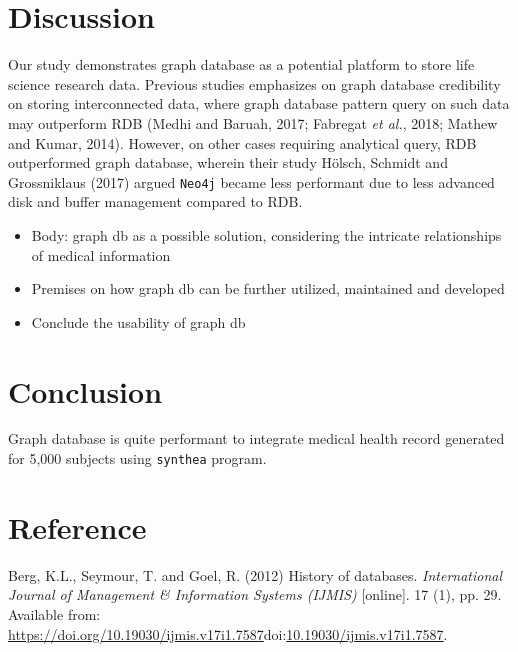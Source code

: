 \documentclass[]{article}
\providecommand{\tightlist}{%
  \setlength{\itemsep}{0pt}\setlength{\parskip}{0pt}}
\begin{document}
\hypertarget{discussion}{%
\section{Discussion}\label{discussion}}

Our study demonstrates graph database as a potential platform to store
life science research data. Previous studies emphasizes on graph
database credibility on storing interconnected data, where graph
database pattern query on such data may outperform RDB (Medhi and
Baruah, 2017; Fabregat \emph{et al.}, 2018; Mathew and Kumar, 2014).
However, on other cases requiring analytical query, RDB outperformed
graph database, wherein their study Hölsch, Schmidt and Grossniklaus
(2017) argued \texttt{Neo4j} became less performant due to less advanced
disk and buffer management compared to RDB.

\begin{itemize}
\tightlist
\item
  Body: graph db as a possible solution, considering the intricate
  relationships of medical information
\item
  Premises on how graph db can be further utilized, maintained and
  developed
\item
  Conclude the usability of graph db
\end{itemize}

\hypertarget{conclusion}{%
\section{Conclusion}\label{conclusion}}

Graph database is quite performant to integrate medical health record
generated for 5,000 subjects using \texttt{synthea} program.

\hypertarget{reference}{%
\section*{Reference}\label{reference}}

\clearpage

\hypertarget{refs}{}
\leavevmode\hypertarget{ref-Berg2012}{}%
Berg, K.L., Seymour, T. and Goel, R. (2012) History of databases.
\emph{International Journal of Management \& Information Systems
(IJMIS)} {[}online{]}. 17 (1), pp. 29. Available from:
\url{https://doi.org/10.19030/ijmis.v17i1.7587}doi:\href{https://doi.org/10.19030/ijmis.v17i1.7587}{10.19030/ijmis.v17i1.7587}.
\end{document}
